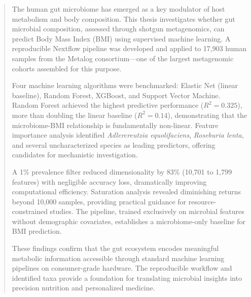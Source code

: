 
\begin{abstract}

The human gut microbiome has emerged as a key modulator of host metabolism and body composition. This thesis investigates whether gut microbial composition, assessed through shotgun metagenomics, can predict Body Mass Index (BMI) using supervised machine learning. A reproducible Nextflow pipeline was developed and applied to 17,903 human samples from the Metalog consortium—one of the largest metagenomic cohorts assembled for this purpose.

Four machine learning algorithms were benchmarked: Elastic Net (linear baseline), Random Forest, XGBoost, and Support Vector Machine. Random Forest achieved the highest predictive performance ($R^2 = 0.325$), more than doubling the linear baseline ($R^2 = 0.14$), demonstrating that the microbiome-BMI relationship is fundamentally non-linear. Feature importance analysis identified \emph{Adlercreutzia equolifaciens}, \emph{Roseburia lenta}, and several uncharacterized species as leading predictors, offering candidates for mechanistic investigation.

A 1\% prevalence filter reduced dimensionality by 83\% (10,701 to 1,799 features) with negligible accuracy loss, dramatically improving computational efficiency. Saturation analysis revealed diminishing returns beyond 10,000 samples, providing practical guidance for resource-constrained studies. The pipeline, trained exclusively on microbial features without demographic covariates, establishes a microbiome-only baseline for BMI prediction.

These findings confirm that the gut ecosystem encodes meaningful metabolic information accessible through standard machine learning pipelines on consumer-grade hardware. The reproducible workflow and identified taxa provide a foundation for translating microbial insights into precision nutrition and personalized medicine.

\end{abstract}


